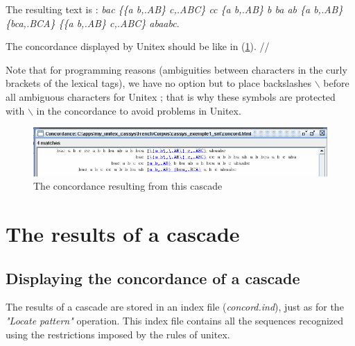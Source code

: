 \bigskip
\noindent The resulting text is : \emph{bac \{\{a b,.AB\} c,.ABC\} cc \{a b,.AB\} b ba ab \{a b,.AB\} \{bca,.BCA\} \{\{a b,.AB\} c,.ABC\} abaabc}.


\bigskip
\noindent The concordance displayed by Unitex should be like in (\ref{fig13-07}). //

Note that for programming reasons (ambiguities between characters in the curly brackets of the lexical tags), we have no option but to place backslashes $\backslash$ before all ambiguous characters for Unitex ; that is why these symbols are protected with $\backslash$ in the concordance to avoid problems in Unitex. 

\begin{figure}[!htb]
  \centering
  \includegraphics[width=15cm]{resources/img/fig13-07.png}
  \caption{The concordance resulting from this cascade}
  \label{fig13-07}
\end{figure}


\section{The results of a cascade}

\subsection{Displaying the concordance of a cascade}
\label{subsec:resultsCascade}

The results of a cascade are stored in an index file (\textit{concord.ind}), just as for the \textit{"Locate pattern"} operation. This index file contains all the sequences recognized using the restrictions imposed by the rules of unitex.

